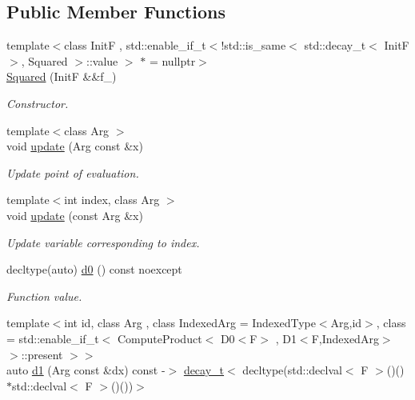 \subsection*{Public Member Functions}
\begin{DoxyCompactItemize}
\item 
{\footnotesize template$<$class Init\-F , std\-::enable\-\_\-if\-\_\-t$<$!std\-::is\-\_\-same$<$ std\-::decay\-\_\-t$<$ Init\-F $>$, Squared $>$\-::value $>$ $\ast$  = nullptr$>$ }\\\hyperlink{structFunG_1_1MathematicalOperations_1_1Squared_af786c2153ef17b5d0ddf8e0b51d060d6}{Squared} (Init\-F \&\&f\-\_\-)
\begin{DoxyCompactList}\small\item\em Constructor. \end{DoxyCompactList}\item 
{\footnotesize template$<$class Arg $>$ }\\void \hyperlink{structFunG_1_1MathematicalOperations_1_1Squared_abea95d90dc29ac105c43f4eadde84cab}{update} (Arg const \&x)
\begin{DoxyCompactList}\small\item\em Update point of evaluation. \end{DoxyCompactList}\item 
{\footnotesize template$<$int index, class Arg $>$ }\\void \hyperlink{structFunG_1_1MathematicalOperations_1_1Squared_a1d890825175df9b79fd73bf8248496ad}{update} (const Arg \&x)
\begin{DoxyCompactList}\small\item\em Update variable corresponding to index. \end{DoxyCompactList}\item 
decltype(auto) \hyperlink{structFunG_1_1MathematicalOperations_1_1Squared_a57252496703fd8fb6af59beb31b597d7}{d0} () const noexcept
\begin{DoxyCompactList}\small\item\em Function value. \end{DoxyCompactList}\item 
{\footnotesize template$<$int id, class Arg , class Indexed\-Arg  = Indexed\-Type$<$\-Arg,id$>$, class  = std\-::enable\-\_\-if\-\_\-t$<$ Compute\-Product$<$ D0$<$\-F$>$ , D1$<$\-F,\-Indexed\-Arg$>$ $>$\-::present $>$$>$ }\\auto \hyperlink{structFunG_1_1MathematicalOperations_1_1Squared_ab8f7f12fe6001c5650d9c8e18e622769}{d1} (Arg const \&dx) const -\/$>$ \hyperlink{namespaceFunG_a7ff91644f18a190ac3d4fc9e970ebe2e}{decay\-\_\-t}$<$ decltype(std\-::declval$<$ F $>$()()$\ast$std\-::declval$<$ F $>$()())$>$

\end{DoxyCompactItemize}
